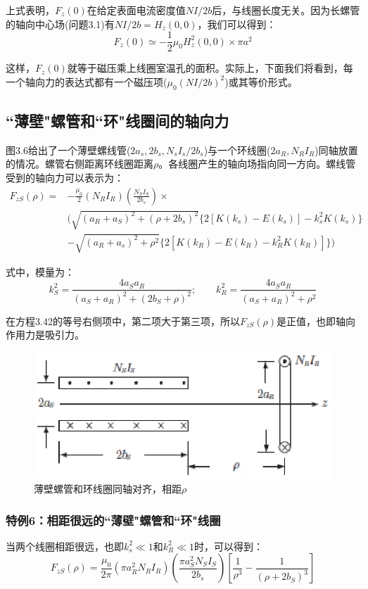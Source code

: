 上式表明，$F_z(0)$在给定表面电流密度值$NI/2b$后，与线圈长度无关。因为长螺管的轴向中心场(问题3.1)有$NI/2b=H_z(0,0)$，我们可以得到：
\begin{equation*}
F_z(0)\simeq -\frac{1}{2}\mu_0 H_z^2(0,0)\times\pi a^2  \tag{3.41''}
\end{equation*}

这样，$F_z(0)$就等于磁压乘上线圈室温孔的面积。实际上，下面我们将看到，每一个轴向力的表达式都有一个磁压项($\mu_0(NI/2b)^2$)或其等价形式。

\subsection{``薄壁"螺管和``环"线圈间的轴向力}
图3.6给出了一个薄壁螺线管($2a_s,2b_s,N_s I_s/2b_s$)与一个环线圈($2a_R,N_R I_R$)同轴放置的情况。螺管右侧距离环线圈距离$\rho$。各线圈产生的轴向场指向同一方向。螺线管受到的轴向力可以表示为：
\begin{equation}
\begin{split}
F_{zS}(\rho)=&-\frac{\mu_0}{2}(N_R I_R)(\frac{N_S I_S}{2b_s})\times\\
&\big(\sqrt{(a_R+a_S)^2+(\rho+2b_s)^2}\{2[K(k_s)-E(k_s)]-k_s^2K(k_s)\}\\
&-\sqrt{(a_R+a_s)^2+\rho^2}\{2[K(k_R)-E(k_R)-k_R^2K(k_R)]\}\big)
\end{split}
\end{equation}

式中，模量为：
$$k_{S}^2=\frac{4a_S a_R}{(a_S+a_R)^2+(2b_S+\rho)^2} ;\qquad k_{R}^2=\frac{4a_S a_R}{(a_S+a_R)^2+\rho^2} $$

在方程3.42的等号右侧项中，第二项大于第三项，所以$F_{zS}(\rho)$是正值，也即轴向作用力是吸引力。
\begin{figure}[htbp]
	\centering
	\includegraphics[scale=1]{chpt3/figs/fig3.6.eps}
	\caption{薄壁螺管和环线圈同轴对齐，相距$\rho$}
\end{figure}

\subsubsection{特例6：相距很远的``薄壁"螺管和``环"线圈}
当两个线圈相距很远，也即$k_s^2\ll 1$和$k_R^2\ll 1$时，可以得到：
\begin{equation}
F_{zS}(\rho)=\frac{\mu_0}{2\pi}(\pi a_R^2N_R I_R)(\frac{\pi a_S^2 N_S I_S}{2 b_s})\left[\frac{1}{\rho^3}-\frac{1}{(\rho+2b_S)^3}\right]
\end{equation}

